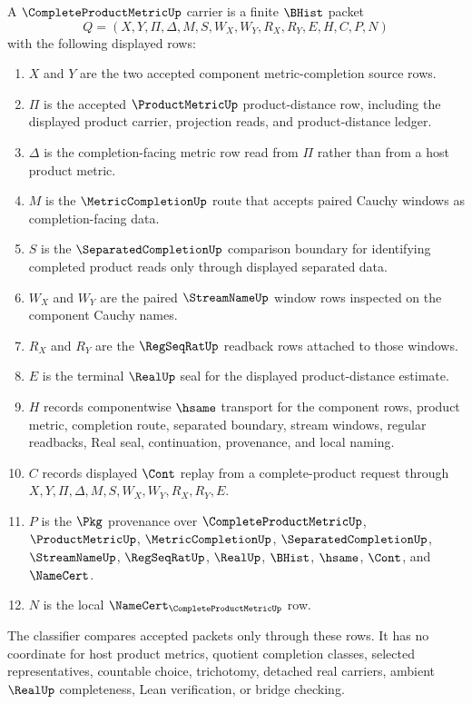 \begin{definition}
\label{def:complete-product-metric-carrier}
A $\CompleteProductMetricUp$ carrier is a finite $\BHist$ packet
$$
Q=(X,Y,\Pi,\Delta,M,S,W_X,W_Y,R_X,R_Y,E,H,C,P,N)
$$
with the following displayed rows:
\begin{enumerate}
\item $X$ and $Y$ are the two accepted component metric-completion source rows.
\item $\Pi$ is the accepted $\ProductMetricUp$ product-distance row, including the displayed product carrier, projection reads, and product-distance ledger.
\item $\Delta$ is the completion-facing metric row read from $\Pi$ rather than from a host product metric.
\item $M$ is the $\MetricCompletionUp$ route that accepts paired Cauchy windows as completion-facing data.
\item $S$ is the $\SeparatedCompletionUp$ comparison boundary for identifying completed product reads only through displayed separated data.
\item $W_X$ and $W_Y$ are the paired $\StreamNameUp$ window rows inspected on the component Cauchy names.
\item $R_X$ and $R_Y$ are the $\RegSeqRatUp$ readback rows attached to those windows.
\item $E$ is the terminal $\RealUp$ seal for the displayed product-distance estimate.
\item $H$ records componentwise $\hsame$ transport for the component rows, product metric, completion route, separated boundary, stream windows, regular readbacks, Real seal, continuation, provenance, and local naming.
\item $C$ records displayed $\Cont$ replay from a complete-product request through $X,Y,\Pi,\Delta,M,S,W_X,W_Y,R_X,R_Y,E$.
\item $P$ is the $\Pkg$ provenance over $\CompleteProductMetricUp$, $\ProductMetricUp$, $\MetricCompletionUp$, $\SeparatedCompletionUp$, $\StreamNameUp$, $\RegSeqRatUp$, $\RealUp$, $\BHist$, $\hsame$, $\Cont$, and $\NameCert$.
\item $N$ is the local $\NameCert_{\CompleteProductMetricUp}$ row.
\end{enumerate}
The classifier compares accepted packets only through these rows. It has no coordinate for host product metrics, quotient completion classes, selected representatives, countable choice, trichotomy, detached real carriers, ambient $\RealUp$ completeness, Lean verification, or bridge checking.
\end{definition}

